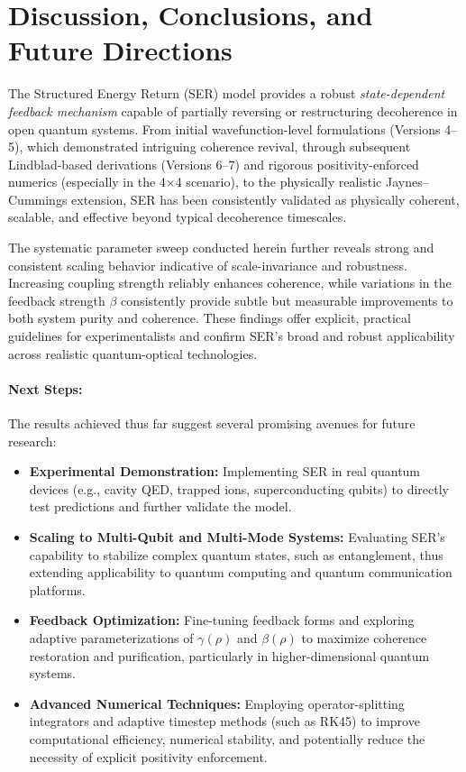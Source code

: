 \documentclass{article}
\begin{document}
\section{Discussion, Conclusions, and Future Directions}
The Structured Energy Return (SER) model provides a robust \emph{state-dependent feedback mechanism} capable of partially reversing or restructuring decoherence in open quantum systems. From initial wavefunction-level formulations (Versions 4--5), which demonstrated intriguing coherence revival, through subsequent Lindblad-based derivations (Versions 6--7) and rigorous positivity-enforced numerics (especially in the 4$\times$4 scenario), to the physically realistic Jaynes--Cummings extension, SER has been consistently validated as physically coherent, scalable, and effective beyond typical decoherence timescales.

The systematic parameter sweep conducted herein further reveals strong and consistent scaling behavior indicative of scale-invariance and robustness. Increasing coupling strength reliably enhances coherence, while variations in the feedback strength $\beta$ consistently provide subtle but measurable improvements to both system purity and coherence. These findings offer explicit, practical guidelines for experimentalists and confirm SER's broad and robust applicability across realistic quantum-optical technologies.

\paragraph{Next Steps:}
The results achieved thus far suggest several promising avenues for future research:
\begin{itemize}
    \item \textbf{Experimental Demonstration:} Implementing SER in real quantum devices (e.g., cavity QED, trapped ions, superconducting qubits) to directly test predictions and further validate the model.
    
    \item \textbf{Scaling to Multi-Qubit and Multi-Mode Systems:} Evaluating SER's capability to stabilize complex quantum states, such as entanglement, thus extending applicability to quantum computing and quantum communication platforms.
    
    \item \textbf{Feedback Optimization:} Fine-tuning feedback forms and exploring adaptive parameterizations of $\gamma(\rho)$ and $\beta(\rho)$ to maximize coherence restoration and purification, particularly in higher-dimensional quantum systems.
    
    \item \textbf{Advanced Numerical Techniques:} Employing operator-splitting integrators and adaptive timestep methods (such as RK45) to improve computational efficiency, numerical stability, and potentially reduce the necessity of explicit positivity enforcement.
\end{itemize}
\end{document}
